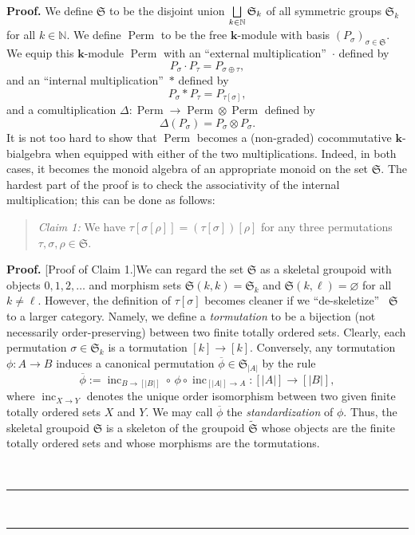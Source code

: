 \documentclass[numbers=enddot,12pt,final,onecolumn,notitlepage]{scrartcl}%
\theoremstyle{definition}
\newenvironment{statement}{\begin{quote}}{\end{quote}}
\newenvironment{proof}[1][Proof]{\noindent\textbf{#1.} }{\ \rule{0.5em}{0.5em}}
\let\sqcupnonlimits\bigsqcup
\renewcommand{\bigsqcup}{\sqcupnonlimits\limits}
\begin{document}
\begin{proof}
We define $\mathfrak{S}$ to be the disjoint union $\bigsqcup\limits_{k\in
\mathbb{N}}\mathfrak{S}_{k}$ of all symmetric groups $\mathfrak{S}_{k}$ for
all $k\in\mathbb{N}$. We define $\operatorname*{Perm}$ to be the free
$\mathbf{k}$-module with basis $\left(  P_{\sigma}\right)  _{\sigma
\in\mathfrak{S}}$. We equip this $\mathbf{k}$-module $\operatorname*{Perm}$
with an \textquotedblleft external multiplication\textquotedblright\ $\cdot$
defined by%
\[
P_{\sigma}\cdot P_{\tau}=P_{\sigma\oplus\tau},
\]
and an \textquotedblleft internal multiplication\textquotedblright\ $\ast$
defined by%
\[
P_{\sigma}\ast P_{\tau}=P_{\tau\left[  \sigma\right]  },
\]
and a comultiplication $\Delta:\operatorname*{Perm}\rightarrow
\operatorname*{Perm}\otimes\operatorname*{Perm}$ defined by%
\[
\Delta\left(  P_{\sigma}\right)  =P_{\sigma}\otimes P_{\sigma}.
\]
It is not too hard to show that $\operatorname*{Perm}$ becomes a (non-graded)
cocommutative $\mathbf{k}$-bialgebra when equipped with either of the two
multiplications. Indeed, in both cases, it becomes the monoid algebra of an
appropriate monoid on the set $\mathfrak{S}$. The hardest part of the proof is
to check the associativity of the internal multiplication; this can be done as follows:

\begin{statement}
\textit{Claim 1:} We have $\tau\left[  \sigma\left[  \rho\right]  \right]
=\left(  \tau\left[  \sigma\right]  \right)  \left[  \rho\right]  $ for any
three permutations $\tau,\sigma,\rho\in\mathfrak{S}$.
\end{statement}

\begin{proof}
[Proof of Claim 1.]We can regard the set $\mathfrak{S}$ as a skeletal groupoid
with objects $0,1,2,\ldots$ and morphism sets $\mathfrak{S}\left(  k,k\right)
=\mathfrak{S}_{k}$ and $\mathfrak{S}\left(  k,\ell\right)  =\varnothing$ for
all $k\neq\ell$. However, the definition of $\tau\left[  \sigma\right]  $
becomes cleaner if we \textquotedblleft de-skeletize\textquotedblright%
\ $\mathfrak{S}$ to a larger category. Namely, we define a \emph{tormutation}
to be a bijection (not necessarily order-preserving) between two finite
totally ordered sets. Clearly, each permutation $\sigma\in\mathfrak{S}_{k}$ is
a tormutation $\left[  k\right]  \rightarrow\left[  k\right]  $. Conversely,
any tormutation $\phi:A\rightarrow B$ induces a canonical permutation
$\overline{\phi}\in\mathfrak{S}_{\left\vert A\right\vert }$ by the rule%
\[
\overline{\phi}:=\operatorname*{inc}\nolimits_{B\rightarrow\left[  \left\vert
B\right\vert \right]  }\circ\,\phi\circ\operatorname*{inc}\nolimits_{\left[
\left\vert A\right\vert \right]  \rightarrow A}:\left[  \left\vert
A\right\vert \right]  \rightarrow\left[  \left\vert B\right\vert \right]  ,
\]
where $\operatorname*{inc}\nolimits_{X\rightarrow Y}$ denotes the unique order
isomorphism between two given finite totally ordered sets $X$ and $Y$. We may
call $\overline{\phi}$ the \emph{standardization} of $\phi$. Thus, the
skeletal groupoid $\mathfrak{S}$ is a skeleton of the groupoid
$\widetilde{\mathfrak{S}}$ whose objects are the finite totally ordered sets
and whose morphisms are the tormutations.


\end{proof}
\end{proof}
\end{document}
